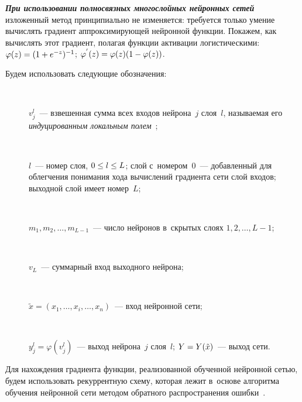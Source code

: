 \begin{multicols}{2}
{\bfseries\textit{При использовании полносвязных многослойных нейронных сетей}}~\cite{14-don}
изложенный метод принципиально не изменяется: требуется только 
умение вычислять градиент  аппроксимирующей нейронной функции. 
Покажем, как  вычислять этот градиент, полагая функции активации 
логистическими: $\varphi(z)\hm=(1+e^{-z})^{-1}$; 
$\varphi^{'}(z)\hm=\varphi(z)(1\hm-\varphi(z))$.

Будем использовать следующие обозначения:
\begin{description}
\item[\,] $v_j^l$~--- 
взвешенная сумма всех входов нейрона~$j$ слоя~$l$, называемая его 
\textit{индуцированным локальным полем}~\cite{14-don};
\item[\,]
$l$~--- номер слоя,  $0\hm\leq l \hm\leq L$; 
слой с~номером~0~--- добавленный для облегчения понимания хода 
вычислений градиента сети слой входов;  выходной слой имеет номер~$L$;
\item[\,]
$m_1,m_2,\dots,m_{L-1}$~--- число нейронов в~скрытых слоях $1,2,\dots,L-1$;
\item[\,]
$v_L$~--- суммарный вход выходного нейрона;
\item[\,]
$\tilde{x}=(x_1,\dots,x_i,\dots,x_n)$~--- вход нейронной сети;
\item[\,]
$y_j^{l}=\varphi(v_j^l)$~--- выход нейрона~$j$ слоя~$l$; 
$Y \hm= Y(\tilde{x})$~--- выход сети.
\end{description}

Для нахождения градиента функции, реализованной обученной нейронной сетью,  
будем использовать рекуррентную схему, которая лежит в~основе алгоритма 
обучения нейронной сети методом обратного распространения ошибки~\cite{14-don}.

 \renewcommand{\figurename}{\protect\bf Алгоритм}
\setcounter{figure}{2}

\begin{figure*}[b] %
\vspace*{-9pt}
 \vspace*{4pt}
 

\end{figure*}
\end{multicols}
